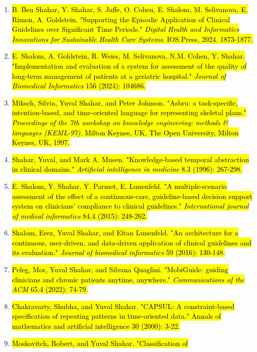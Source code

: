 \documentclass[
]{article}
\begin{document}
\begin{enumerate}
\def\labelenumi{\arabic{enumi}.}
\item
  \hl{B. Ben Shahar, Y. Shahar, S. Jaffe, O. Cohen, E. Shalom, M.
  Selivanova, E. Rimon, A. Goldstein. "Supporting the Episodic
  Application of Clinical Guidelines over Significant Time Periods."
  \emph{Digital Health and Informatics Innovations for Sustainable
  Health Care Systems}. IOS Press, 2024. 1873-1877.‏}
\item
  \hl{E. Shalom, A. Goldstein, R. Weiss, M. Selivanova, N.M. Cohen, Y.
  Shahar. "Implementation and evaluation of a system for assessment of
  the quality of long-term management of patients at a geriatric
  hospital." \emph{Journal of Biomedical Informatics} 156 (2024):
  104686.‏}
\item
  \hl{Miksch, Silvia, Yuval Shahar, and Peter Johnson. "Asbru: a
  task-specific, intention-based, and time-oriented language for
  representing skeletal plans." \emph{Proceedings of the 7th workshop on
  knowledge engineering: methods \& languages (KEML-97)}. Milton Keynes,
  UK, The Open University, Milton Keynes, UK, 1997.‏}
\item
  \hl{Shahar, Yuval, and Mark A. Musen. "Knowledge-based temporal
  abstraction in clinical domains." \emph{Artificial intelligence in
  medicine} 8.3 (1996): 267-298.‏}
\item
  \hl{E. Shalom, Y. Shahar, Y. Parmet, E. Lunenfeld. "A
  multiple-scenario assessment of the effect of a continuous-care,
  guideline-based decision support system on clinicians' compliance to
  clinical guidelines." \emph{International journal of medical
  informatics} 84.4 (2015): 248-262.‏}
\item
  \hl{Shalom, Erez, Yuval Shahar, and Eitan Lunenfeld. "An architecture
  for a continuous, user-driven, and data-driven application of clinical
  guidelines and its evaluation." \emph{Journal of biomedical
  informatics} 59 (2016): 130-148.‏}
\item
  \hl{Peleg, Mor, Yuval Shahar, and Silvana Quaglini. "MobiGuide:
  guiding clinicians and chronic patients anytime, anywhere."
  \emph{Communications of the ACM} 65.4 (2022): 74-79.‏}
\item
  \hl{Chakravarty, Shubha, and Yuval Shahar. "CAPSUL: A constraint-based
  specification of repeating patterns in time-oriented data." Annals of
  mathematics and artificial intelligence 30 (2000): 3-22.‏}
\item
  \hl{Moskovitch, Robert, and Yuval Shahar. "Classification of
}
\end{enumerate}
\end{document}
